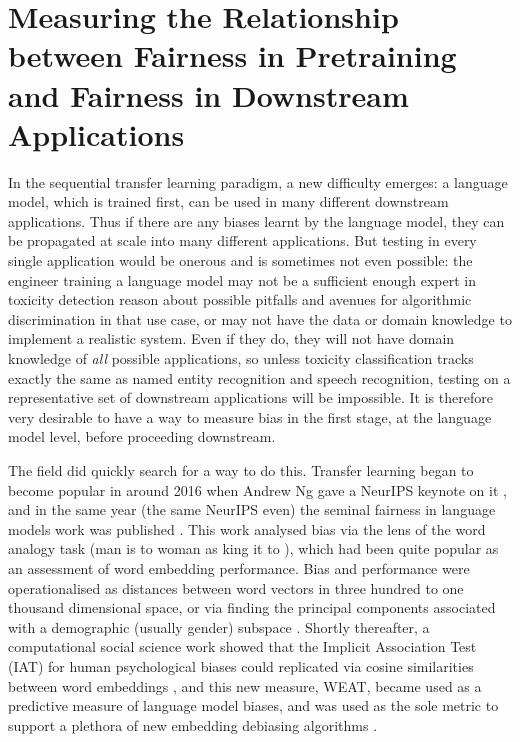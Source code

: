 \part{Measuring the Relationship between Fairness in Pretraining and Fairness in Downstream Applications}
\label{part:measurement}

In the sequential transfer learning paradigm, a new difficulty emerges: a language model, which is trained first, can be used in many different downstream applications. Thus if there are any biases learnt by the language model, they can be propagated at scale into many different applications. But testing in every single application would be onerous and is sometimes not even possible: the engineer training a language model may not be a sufficient enough expert in toxicity detection reason about possible pitfalls and avenues for algorithmic discrimination in that use case, or may not have the data or domain knowledge to implement a realistic system. Even if they do, they will not have domain knowledge of \textit{all} possible applications, so unless toxicity classification tracks exactly the same as named entity recognition and speech recognition, testing on a representative set of downstream applications will be impossible. It is therefore very desirable to have a way to measure bias in the first stage, at the language model level, before proceeding downstream. 

The field did quickly search for a way to do this. Transfer learning began to become popular in around 2016 when Andrew Ng gave a NeurIPS keynote on it \citep{ng2016nuts}, and in the same year (the same NeurIPS even) the seminal fairness in language models work was published \citep{bolukbasi}. This work analysed bias via the lens of the word analogy task (man is to woman as king it to \textunderscore), which had been quite popular as an assessment of word embedding performance. Bias and performance were operationalised as distances between word vectors in three hundred to one thousand dimensional space, or via finding the principal components associated with a demographic (usually gender) subspace \citep{ethayarajh_ripa}. Shortly thereafter, a computational social science work showed that the Implicit Association Test (IAT) for human psychological biases could replicated via cosine similarities between word embeddings \citet{Caliskan2017SemanticsDA}, and this new measure, WEAT, became used as a predictive measure of language model biases, and was used as the sole metric to support a plethora of new embedding debiasing algorithms \citep{list_alot}.  

